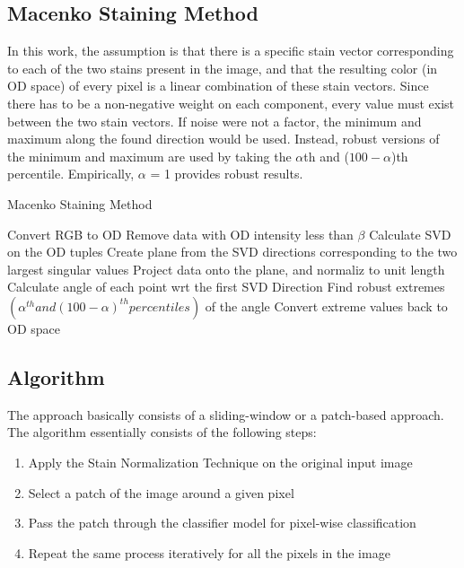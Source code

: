 \documentclass{nitk}
\begin{document}
\subsection{Macenko\cite{macenko2009method} Staining Method}

In this work\cite{macenko2009method}, the assumption is that there is a specific stain vector corresponding to each of the two stains present in the image, and that the resulting color (in OD space) of every pixel is a linear combination of these stain vectors. Since there has to be a non-negative weight on each component, every value must exist between the two stain vectors. If noise were not a factor, the minimum and maximum along the found direction would be used. Instead, robust versions of the minimum and maximum are used by taking the $\alpha$th and ($100-\alpha$)th percentile. Empirically, $\alpha$ = 1 provides robust results.

\begin{algorithm}
\caption{Macenko Staining Method}
\begin{algorithmic}[1]
\State Convert RGB to OD
\State Remove data with OD intensity less than $\beta$
\State Calculate SVD on the OD tuples
\State Create plane from the SVD directions corresponding to the two largest singular values
\State Project data onto the plane, and normaliz to unit length
\State Calculate angle of each point wrt the first SVD Direction
\State Find robust extremes $(\alpha^{th} and (100-\alpha)^{th} percentiles)$ of the angle
\State Convert extreme values back to OD space
\end{algorithmic}
\end{algorithm}

\subsection{Algorithm}

The approach basically consists of a sliding-window or a patch-based approach. The algorithm essentially consists of the following steps:

\begin{enumerate}
    \item Apply the Stain Normalization Technique on the original input image
    \item Select a patch of the image around a given pixel
    \item Pass the patch through the classifier model for pixel-wise classification
    \item Repeat the same process iteratively for all the pixels in the image
\end{enumerate}
\end{document}

